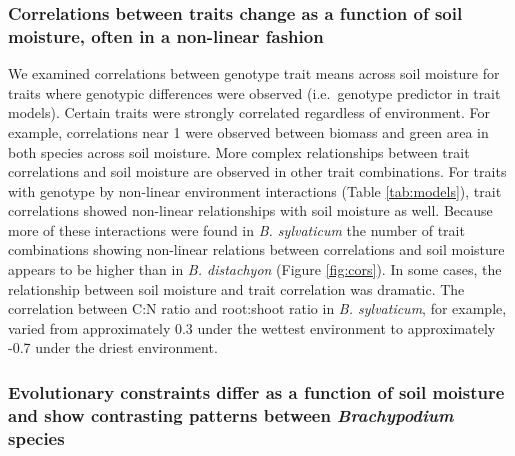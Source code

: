 \documentclass[jou,floatsintext]{apa6}
\begin{document}
\hypertarget{correlations-between-traits-change-as-a-function-of-soil-moisture-often-in-a-non-linear-fashion}{%
\subsubsection{Correlations between traits change as a function of soil moisture, often in a non-linear fashion}\label{correlations-between-traits-change-as-a-function-of-soil-moisture-often-in-a-non-linear-fashion}}

We examined correlations between genotype trait means across soil moisture for traits where genotypic differences were observed (i.e.~genotype predictor in trait models). Certain traits were strongly correlated regardless of environment. For example, correlations near 1 were observed between biomass and green area in both species across soil moisture. More complex relationships between trait correlations and soil moisture are observed in other trait combinations. For traits with genotype by non-linear environment interactions (Table \ref{tab:models}), trait correlations showed non-linear relationships with soil moisture as well. Because more of these interactions were found in \emph{B. sylvaticum} the number of trait combinations showing non-linear relations between correlations and soil moisture appears to be higher than in \emph{B. distachyon} (Figure \ref{fig:cors}). In some cases, the relationship between soil moisture and trait correlation was dramatic. The correlation between C:N ratio and root:shoot ratio in \emph{B. sylvaticum}, for example, varied from approximately 0.3 under the wettest environment to approximately -0.7 under the driest environment.

\hypertarget{evolutionary-constraints-differ-as-a-function-of-soil-moisture-and-show-contrasting-patterns-between-brachypodium-species}{%
\subsubsection{\texorpdfstring{Evolutionary constraints differ as a function of soil moisture and show contrasting patterns between \emph{Brachypodium} species}{Evolutionary constraints differ as a function of soil moisture and show contrasting patterns between Brachypodium species}}\label{evolutionary-constraints-differ-as-a-function-of-soil-moisture-and-show-contrasting-patterns-between-brachypodium-species}}
\end{document}
